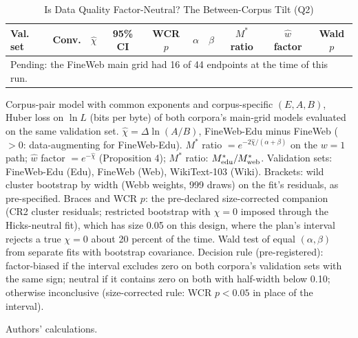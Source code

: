 \begin{table}[tp]
\centering
\caption{Is Data Quality Factor-Neutral? The Between-Corpus Tilt (Q2)}
\label{tab:m9-tilt}
\footnotesize
\setlength{\tabcolsep}{3pt}
\begin{tabular*}{\textwidth}{@{\extracolsep{\fill}}llcccccccc@{}}
\toprule
Val. set & Conv. & $\hat\chi$ & 95\% CI & WCR $p$ & $\alpha$ & $\beta$ & $M^*$ ratio & $\hat w$ factor & Wald $p$ \\
\midrule
\multicolumn{10}{l}{Pending: the FineWeb main grid had 16 of 44 endpoints at the time of this run.} \\
\bottomrule
\end{tabular*}

\begin{tablenotes}
Corpus-pair model with common exponents and corpus-specific $(E,A,B)$, Huber loss on $\ln L$ (bits per byte) of both corpora's main-grid models evaluated on the same validation set. $\hat\chi=\Delta\ln(A/B)$, FineWeb-Edu minus FineWeb ($>0$: data-augmenting for FineWeb-Edu). $M^*$ ratio $=e^{-2\hat\chi/(\alpha+\beta)}$ on the $w=1$ path; $\hat w$ factor $=e^{-\hat\chi}$ (Proposition 4); $M^*$ ratio: $M^*_{\rm edu}/M^*_{\rm web}$. Validation sets: FineWeb-Edu (Edu), FineWeb (Web), WikiText-103 (Wiki). Brackets: wild cluster bootstrap by width (Webb weights, 999 draws) on the fit's residuals, as pre-specified. Braces and WCR $p$: the pre-declared size-corrected companion (CR2 cluster residuals; restricted bootstrap with $\chi=0$ imposed through the Hicks-neutral fit), which has size 0.05 on this design, where the plan's interval rejects a true $\chi=0$ about 20 percent of the time. Wald test of equal $(\alpha,\beta)$ from separate fits with bootstrap covariance. Decision rule (pre-registered): factor-biased if the interval excludes zero on both corpora's validation sets with the same sign; neutral if it contains zero on both with half-width below 0.10; otherwise inconclusive (size-corrected rule: WCR $p<0.05$ in place of the interval).
\end{tablenotes}

\begin{tablenotes}[Source]
Authors' calculations.
\end{tablenotes}
\end{table}
